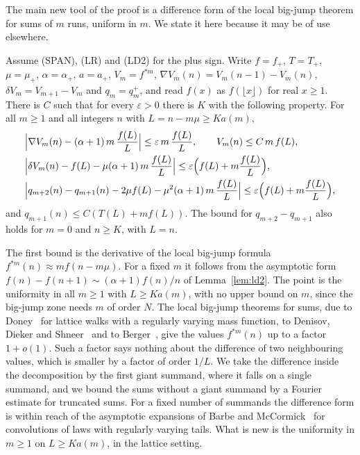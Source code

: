 The main new tool of the proof is a difference form of the local big-jump theorem for sums of
$m$ runs, uniform in $m$. We state it here because it may be of use elsewhere.

\begin{lemma}\label{lem:diff-bigjump}
Assume (SPAN), (LR) and (LD2) for the plus sign. Write $f=f_\plus$, $T=T_\plus$,
$\mu=\mu_\plus$, $\alpha=\alpha_\plus$, $a=a_\plus$, $V_m=f^{*m}$, $\nabla V_m(n)=V_m(n-1)-V_m(n)$,
$\delta V_m=V_{m+1}-V_m$ and $q_m=q^\plus_m$, and read $f(x)$ as $f(\lfloor x\rfloor)$ for real
$x\ge1$. There is $C$ such that for every $\varepsilon>0$ there is $K$ with the following
property. For all $m\ge1$ and all integers $n$ with $L=n-m\mu\ge Ka(m)$,
\begin{align*}
 &\Bigl|\nabla V_m(n)-(\alpha+1)\,m\,\frac{f(L)}{L}\Bigr|\le\varepsilon\,m\,\frac{f(L)}{L},
 \qquad V_m(n)\le C\,m\,f(L),\\
 &\Bigl|\delta V_m(n)-f(L)-\mu(\alpha+1)\,m\,\frac{f(L)}{L}\Bigr|\le\varepsilon\Bigl(f(L)+m\frac{f(L)}{L}\Bigr),\\
 &\Bigl|q_{m+2}(n)-q_{m+1}(n)-2\mu f(L)-\mu^2(\alpha+1)\,m\,\frac{f(L)}{L}\Bigr|\le\varepsilon\Bigl(f(L)+m\frac{f(L)}{L}\Bigr),
\end{align*}
and $q_{m+1}(n)\le C(T(L)+mf(L))$. The bound for $q_{m+2}-q_{m+1}$ also holds for $m=0$ and
$n\ge K$, with $L=n$.
\end{lemma}

The first bound is the derivative of the local big-jump formula $f^{*m}(n)\approx mf(n-m\mu)$.
For a fixed $m$ it follows from the asymptotic form $f(n)-f(n+1)\sim(\alpha+1)f(n)/n$ of
Lemma~\ref{lem:ld2}. The point is the uniformity in all $m\ge1$ with $L\ge Ka(m)$, with no upper
bound on $m$, since the big-jump zone needs $m$ of order $N$. The local big-jump theorems for
sums, due to Doney~\cite{doney1989} for lattice walks with a regularly varying mass function, to
Denisov, Dieker and Shneer~\cite[Theorem~9.1]{dds2008} and to
Berger~\cite[Theorem~2.4]{berger2019ptrf}, give the values $f^{*m}(n)$ up to a factor $1+o(1)$.
Such a factor says nothing about the difference of two neighbouring values, which is smaller by a
factor of order $1/L$. We take the difference inside the decomposition by the first giant
summand, where it falls on a single summand, and we bound the sums without a giant summand by a
Fourier estimate for truncated sums. For a fixed number of summands the difference form is
within reach of the asymptotic expansions of Barbe and McCormick~\cite{barbemccormick2009} for
convolutions of laws with regularly varying tails. What is new is the uniformity in $m\ge1$ on
$L\ge Ka(m)$, in the lattice setting.


